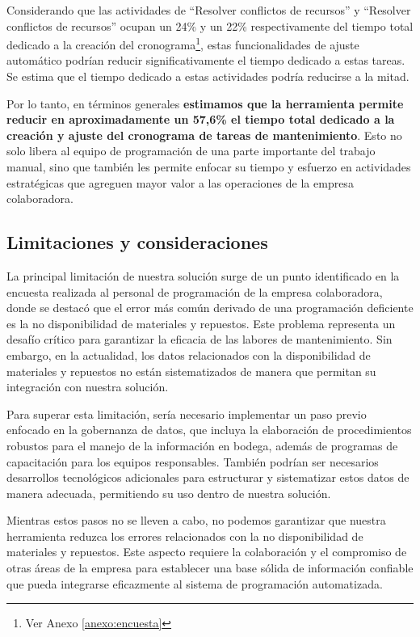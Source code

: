 \documentclass{article}
\begin{document}
Considerando que las actividades de ``Resolver conflictos de recursos'' y ``Resolver conflictos de recursos'' ocupan un 24\% y un 22\% respectivamente del tiempo total dedicado a la creación del cronograma\footnote{Ver Anexo \ref{anexo:encuesta}}, estas funcionalidades de ajuste automático podrían reducir significativamente el tiempo dedicado a estas tareas. Se estima que el tiempo dedicado a estas actividades podría reducirse a la mitad.

Por lo tanto, en términos generales \textbf{estimamos que la herramienta permite reducir en aproximadamente un 57,6\%  el tiempo total dedicado a la creación y ajuste del cronograma de tareas de mantenimiento}. Esto no solo libera al equipo de programación de una parte importante del trabajo manual, sino que también les permite enfocar su tiempo y esfuerzo en actividades estratégicas que agreguen mayor valor a las operaciones de la empresa colaboradora.

\subsection{Limitaciones y consideraciones}

La principal limitación de nuestra solución surge de un punto identificado en la encuesta realizada al personal de programación de la empresa colaboradora, donde se destacó que el error más común derivado de una programación deficiente es la no disponibilidad de materiales y repuestos. Este problema representa un desafío crítico para garantizar la eficacia de las labores de mantenimiento. Sin embargo, en la actualidad, los datos relacionados con la disponibilidad de materiales y repuestos no están sistematizados de manera que permitan su integración con nuestra solución.

Para superar esta limitación, sería necesario implementar un paso previo enfocado en la gobernanza de datos, que incluya la elaboración de procedimientos robustos para el manejo de la información en bodega, además de programas de capacitación para los equipos responsables. También podrían ser necesarios desarrollos tecnológicos adicionales para estructurar y sistematizar estos datos de manera adecuada, permitiendo su uso dentro de nuestra solución.

Mientras estos pasos no se lleven a cabo, no podemos garantizar que nuestra herramienta reduzca los errores relacionados con la no disponibilidad de materiales y repuestos. Este aspecto requiere la colaboración y el compromiso de otras áreas de la empresa para establecer una base sólida de información confiable que pueda integrarse eficazmente al sistema de programación automatizada.
\end{document}
